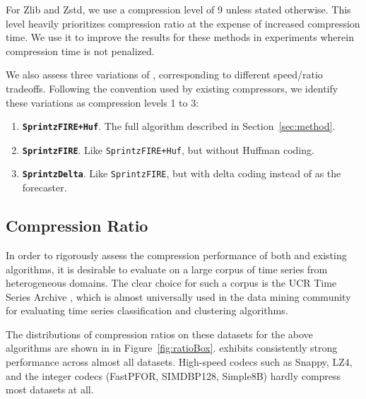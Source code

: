 For Zlib and Zstd, we use a compression level of 9 unless stated otherwise. This level heavily prioritizes compression ratio at the expense of increased compression time. We use it to improve the results for these methods in experiments wherein compression time is not penalized.

We also assess three variations of \mine, corresponding to different speed/ratio tradeoffs. Following the convention used by existing compressors, we identify these variations as compression levels 1 to 3:
\begin{enumerate}
\itemsep-1mm
    \item \textbf{\texttt{SprintzFIRE+Huf}}. The full algorithm described in Section~\ref{sec:method}.
    \item \textbf{\texttt{SprintzFIRE}}. Like \texttt{SprintzFIRE+Huf}, but without Huffman coding.
    \item \textbf{\texttt{SprintzDelta}}. Like \texttt{SprintzFIRE}, but with delta coding instead of \fire as the forecaster.
\end{enumerate}



\subsection{Compression Ratio}

In order to rigorously assess the compression performance of both \minesp and existing algorithms, it is desirable to evaluate on a large corpus of time series from heterogeneous domains. The clear choice for such a corpus is the UCR Time Series Archive \cite{ucrTimeSeries}, which is almost universally used in the data mining community for evaluating time series classification and clustering algorithms.

The distributions of compression ratios on these datasets for the above algorithms are shown in in Figure~\ref{fig:ratioBox}. \minesp exhibits consistently strong performance across almost all datasets. High-speed codecs such as Snappy, LZ4, and the integer codecs (FastPFOR, SIMDBP128, Simple8B) hardly compress most datasets at all.

